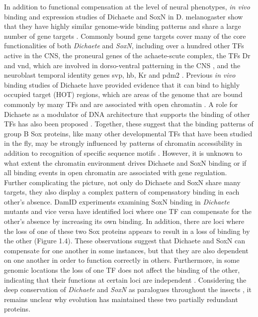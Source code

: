 In addition to functional compensation at the level of neural phenotypes, \emph{in vivo} binding and expression studies of Dichaete and SoxN in D. melanogaster show that they have highly similar genome-wide binding patterns and share a large number of gene targets \citep{aleksic_role_2013,ferrero_soxneuro_2014}. Commonly bound gene targets cover many of the core functionalities of both \emph{Dichaete} and \emph{SoxN}, including over a hundred other TFs active in the CNS, the proneural genes of the achaete-scute complex, the TFs Dr and vnd, which are involved in dorso-ventral patterning in the CNS \citep{zhao_genetic_2007}, and the neuroblast temporal identity genes svp, hb, Kr and pdm2 \citep{ferrero_soxneuro_2014,isshiki_drosophila_2001,maurange_brainy_2005}. Previous \emph{in vivo} binding studies of Dichaete have provided evidence that it can bind to highly occupied target (HOT) regions, which are areas of the genome that are bound commonly by many TFs and are associated with open chromatin \citep{aleksic_role_2013,kvon_hot_2012}. A role for Dichaete as a modulator of DNA architecture that supports the binding of other TFs has also been proposed \citep{russell_dichaete_1996}. Together, these suggest that the binding patterns of group B Sox proteins, like many other developmental TFs that have been studied in the fly, may be strongly influenced by patterns of chromatin accessibility in addition to recognition of specific sequence motifs \citep{ferrero_soxneuro_2014,macarthur_developmental_2009}. However, it is unknown to what extent the chromatin environment drives Dichaete and SoxN binding or if all binding events in open chromatin are associated with gene regulation.\\

Further complicating the picture, not only do Dichaete and SoxN share many targets, they also display a complex pattern of compensatory binding in each other’s absence. DamID experiments examining SoxN binding in \emph{Dichaete} mutants and vice versa have identified loci where one TF can compensate for the other’s absence by increasing its own binding. In addition, there are loci where the loss of one of these two Sox proteins appears to result in a loss of binding by the other (Figure 1.4). These observations suggest that Dichaete and SoxN can compensate for one another in some instances, but that they are also dependent on one another in order to function correctly in others. Furthermore, in some genomic locations the loss of one TF does not affect the binding of the other, indicating that their functions at certain loci are independent \citep{ferrero_soxneuro_2014}. Considering the deep conservation of \emph{Dichaete} and \emph{SoxN} as paralogues throughout the insects \citep{mckimmie_conserved_2005,wilson_evolution_2008}, it remains unclear why evolution has maintained these two partially redundant proteins. \\

